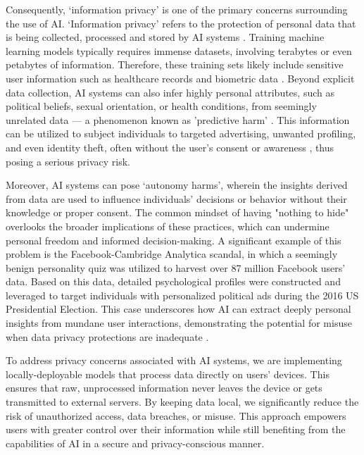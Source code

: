 \documentclass[licencjacka,en]{pracamgr}
\begin{document}
Consequently, ‘information privacy’ is one of the primary concerns surrounding the use of AI. ‘Information privacy’ refers to the protection of personal data that is being collected, processed and stored by AI systems \cite{transcend}. Training machine learning models typically requires immense datasets, involving terabytes or even petabytes of information. Therefore, these training sets likely include sensitive user information such as healthcare records and biometric data \cite{ibm_vast_data}. Beyond explicit data collection, AI systems can also infer highly personal attributes, such as political beliefs, sexual orientation, or health conditions, from seemingly unrelated data — a phenomenon known as 'predictive harm' \cite{transcend}. This information can be utilized to subject individuals to targeted advertising, unwanted profiling, and even identity theft, often without the user’s consent or awareness \cite{data_guard}, thus posing a serious privacy risk.

Moreover, AI systems can pose ‘autonomy harms’, wherein the insights derived from data are used to influence individuals' decisions or behavior without their knowledge or proper consent. The common mindset of having "nothing to hide" overlooks the broader implications of these practices, which can undermine personal freedom and informed decision-making. A significant example of this problem is the Facebook-Cambridge Analytica scandal, in which a seemingly benign personality quiz was utilized to harvest over 87 million Facebook users’ data. Based on this data, detailed psychological profiles were constructed and leveraged to target individuals with personalized political ads during the 2016 US Presidential Election. This case underscores how AI can extract deeply personal insights from mundane user interactions, demonstrating the potential for misuse when data privacy protections are inadequate \cite{transcend}.

To address privacy concerns associated with AI systems, we are implementing locally-deployable models that process data directly on users' devices. This ensures that raw, unprocessed information never leaves the device or gets transmitted to external servers. By keeping data local, we significantly reduce the risk of unauthorized access, data breaches, or misuse. This approach empowers users with greater control over their information while still benefiting from the capabilities of AI in a secure and privacy-conscious manner.
\end{document}
